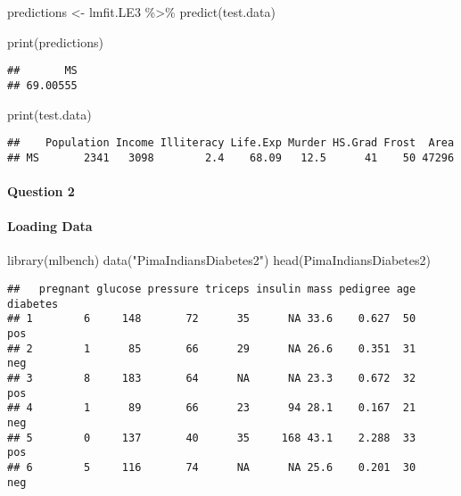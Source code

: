 \documentclass[
]{article}
\newenvironment{Shaded}{\begin{snugshade}}{\end{snugshade}}
\newcommand{\FunctionTok}[1]{\textcolor[rgb]{0.00,0.00,0.00}{#1}}
\newcommand{\NormalTok}[1]{#1}
\newcommand{\OtherTok}[1]{\textcolor[rgb]{0.56,0.35,0.01}{#1}}
\newcommand{\SpecialCharTok}[1]{\textcolor[rgb]{0.00,0.00,0.00}{#1}}
\newcommand{\StringTok}[1]{\textcolor[rgb]{0.31,0.60,0.02}{#1}}
\begin{document}
\begin{Shaded}
\begin{Highlighting}[]
\NormalTok{predictions }\OtherTok{\textless{}{-}}\NormalTok{ lmfit.LE3 }\SpecialCharTok{\%\textgreater{}\%} \FunctionTok{predict}\NormalTok{(test.data)}

\FunctionTok{print}\NormalTok{(predictions)}
\end{Highlighting}
\end{Shaded}

\begin{verbatim}
##       MS 
## 69.00555
\end{verbatim}

\begin{Shaded}
\begin{Highlighting}[]
\FunctionTok{print}\NormalTok{(test.data)}
\end{Highlighting}
\end{Shaded}

\begin{verbatim}
##    Population Income Illiteracy Life.Exp Murder HS.Grad Frost  Area
## MS       2341   3098        2.4    68.09   12.5      41    50 47296
\end{verbatim}

\hypertarget{question-2}{%
\paragraph{Question 2}\label{question-2}}

\hypertarget{loading-data-1}{%
\paragraph{Loading Data}\label{loading-data-1}}

\begin{Shaded}
\begin{Highlighting}[]
\FunctionTok{library}\NormalTok{(mlbench)}
\FunctionTok{data}\NormalTok{(}\StringTok{"PimaIndiansDiabetes2"}\NormalTok{)}
\FunctionTok{head}\NormalTok{(PimaIndiansDiabetes2)}
\end{Highlighting}
\end{Shaded}

\begin{verbatim}
##   pregnant glucose pressure triceps insulin mass pedigree age diabetes
## 1        6     148       72      35      NA 33.6    0.627  50      pos
## 2        1      85       66      29      NA 26.6    0.351  31      neg
## 3        8     183       64      NA      NA 23.3    0.672  32      pos
## 4        1      89       66      23      94 28.1    0.167  21      neg
## 5        0     137       40      35     168 43.1    2.288  33      pos
## 6        5     116       74      NA      NA 25.6    0.201  30      neg
\end{verbatim}
\end{document}

